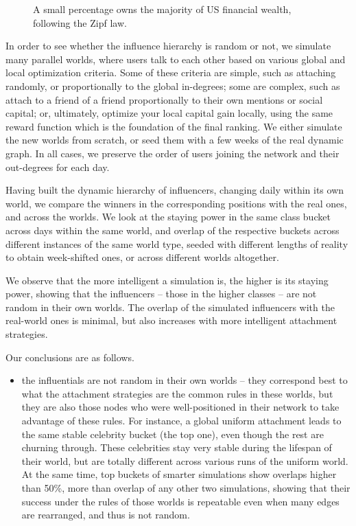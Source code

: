 \documentclass[10pt,oneside]{memoir}
\begin{document}
\begin{Spacing}{2}
\begin{figure}[ht]
    \caption{A small percentage owns the majority of US financial wealth, following the Zipf law.}
    \label{figure:us-fin-wealth-hierarchy}
\endminipage
\end{figure}
In order to see whether the influence hierarchy is random or not, we simulate many parallel worlds, where users talk to each other based on various global and local optimization criteria.  Some of these criteria are simple, such as attaching randomly, or proportionally to the global in-degrees; some are complex, such as attach to a friend of a friend proportionally to their own mentions or social capital; or, ultimately, optimize your local capital gain locally, using the same reward function which is the foundation of the final ranking.  We either simulate the new worlds from scratch, or seed them with a few weeks of the real dynamic graph.  In all cases, we preserve the order of users joining the network and their out-degrees for each day.


Having built the dynamic hierarchy of influencers, changing daily within its own world, we compare the winners in the corresponding positions with the real ones, and across the worlds.  We look at the staying power in the same class bucket across days within the same world, and overlap of the respective buckets across different instances of the same world type, seeded with different lengths of reality to obtain week-shifted ones, or across different worlds altogether.


We observe that the more intelligent a simulation is, the higher is its staying power, showing that the influencers -- those in the higher classes -- are not random in their own worlds.  The overlap of the simulated influencers with the real-world ones is minimal, but also increases with more intelligent attachment strategies.


Our conclusions are as follows.


\begin{itemize}


\item the influentials are not random in their own worlds -- they correspond best to what the attachment strategies are the common rules in these worlds, but they are also those nodes who were well-positioned in their network to take advantage of these rules.  For instance, a global uniform attachment leads to the same stable celebrity bucket (the top one), even though the rest are churning through.  These celebrities stay very stable during the lifespan of their world, but are totally different across various runs of the uniform world.  At the same time, top buckets of smarter simulations show overlaps higher than 50\%, more than overlap of any other two simulations, showing that their success under the rules of those worlds is repeatable even when many edges are rearranged, and thus is not random.





\end{itemize}
\end{Spacing}
\end{document}

